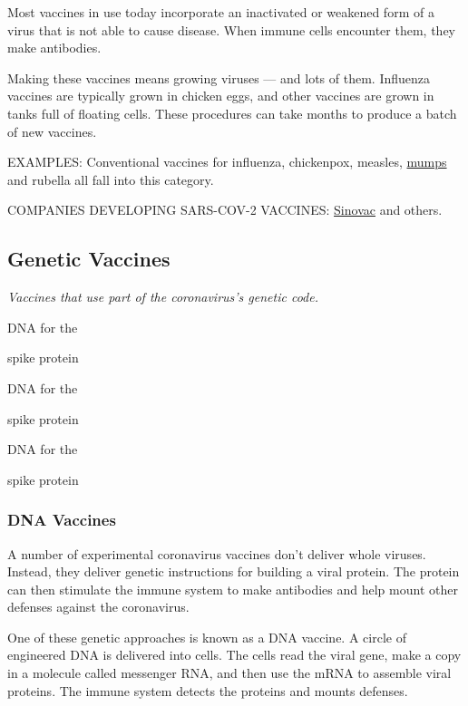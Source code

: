 Most vaccines in use today incorporate an inactivated or weakened form
of a virus that is not able to cause disease. When immune cells
encounter them, they make antibodies.

Making these vaccines means growing viruses --- and lots of them.
Influenza vaccines are typically grown in chicken eggs, and other
vaccines are grown in tanks full of floating cells. These procedures can
take months to produce a batch of new vaccines.

EXAMPLES: Conventional vaccines for influenza, chickenpox, measles,
\href{https://www.nytimes3xbfgragh.onion/2020/05/02/us/politics/vaccines-coronavirus-research.html}{mumps}
and rubella all fall into this category.

COMPANIES DEVELOPING SARS-COV-2 VACCINES:
\href{https://www.nytimes3xbfgragh.onion/2020/05/04/business/coronavirus-china-vaccine.html}{Sinovac}
and others.

\hypertarget{genetic-vaccines}{%
\subsection{\texorpdfstring{\textbf{Genetic
Vaccines}}{Genetic Vaccines}}\label{genetic-vaccines}}

\emph{Vaccines that use part of the coronavirus's genetic code.}

DNA for the

spike protein

DNA for the

spike protein

DNA for the

spike protein

\hypertarget{dna-vaccines}{%
\subsubsection{\texorpdfstring{\textbf{DNA
Vaccines}}{DNA Vaccines}}\label{dna-vaccines}}

A number of experimental coronavirus vaccines don't deliver whole
viruses. Instead, they deliver genetic instructions for building a viral
protein. The protein can then stimulate the immune system to make
antibodies and help mount other defenses against the coronavirus.

One of these genetic approaches is known as a DNA vaccine. A circle of
engineered DNA is delivered into cells. The cells read the viral gene,
make a copy in a molecule called messenger RNA, and then use the mRNA to
assemble viral proteins. The immune system detects the proteins and
mounts defenses.

